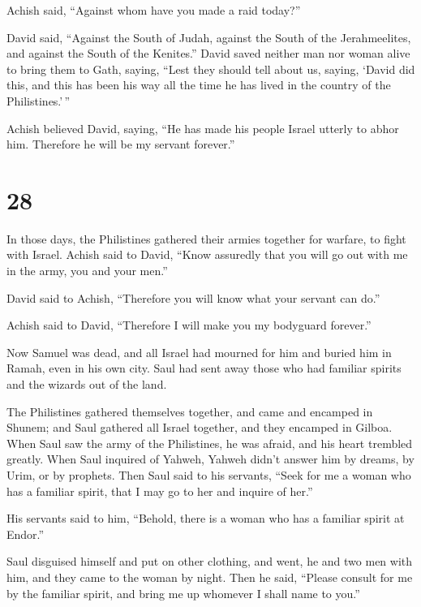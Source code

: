  Achish said, ``Against whom have you made a raid
today?''

David said, ``Against the South of Judah, against the South of the
Jerahmeelites, and against the South of the Kenites.'' 
David saved neither man nor woman alive to bring them to Gath, saying,
``Lest they should tell about us, saying, `David did this, and this has
been his way all the time he has lived in the country of the
Philistines.'\,''

 Achish believed David, saying, ``He has made his people
Israel utterly to abhor him. Therefore he will be my servant forever.''

\hypertarget{section-27}{%
\section{28}\label{section-27}}

 In those days, the Philistines gathered their armies
together for warfare, to fight with Israel. Achish said to David, ``Know
assuredly that you will go out with me in the army, you and your men.''

 David said to Achish, ``Therefore you will know what your
servant can do.''

Achish said to David, ``Therefore I will make you my bodyguard
forever.''

 Now Samuel was dead, and all Israel had mourned for him
and buried him in Ramah, even in his own city. Saul had sent away those
who had familiar spirits and the wizards out of the land.

 The Philistines gathered themselves together, and came
and encamped in Shunem; and Saul gathered all Israel together, and they
encamped in Gilboa.  When Saul saw the army of the
Philistines, he was afraid, and his heart trembled greatly.
 When Saul inquired of Yahweh, Yahweh didn't answer him by
dreams, by Urim, or by prophets.  Then Saul said to his
servants, ``Seek for me a woman who has a familiar spirit, that I may go
to her and inquire of her.''

His servants said to him, ``Behold, there is a woman who has a familiar
spirit at Endor.''

 Saul disguised himself and put on other clothing, and
went, he and two men with him, and they came to the woman by night. Then
he said, ``Please consult for me by the familiar spirit, and bring me up
whomever I shall name to you.''

